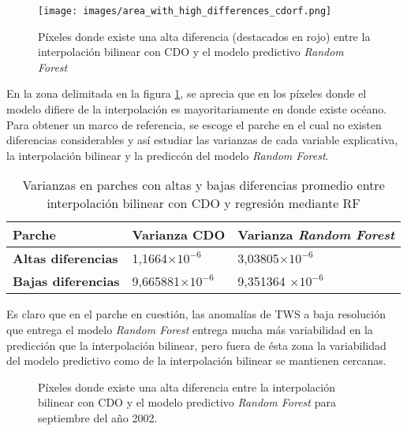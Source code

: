 \begin{figure}[H]
    \centering
          \texttt{[image: images/area\_with\_high\_differences\_cdorf.png]}
          \vskip -0.1in
    \caption[Área donde la interpolación bilinear y el modelo predictivo difieren considerablemente]{Píxeles donde existe una alta diferencia (destacados en rojo) entre la interpolación bilinear con CDO y el modelo predictivo \textit{Random Forest}}
    \label{high_diff}
\end{figure}
En la zona delimitada en la figura \ref{high_diff}, se aprecia que en los píxeles donde el modelo difiere de la interpolación es mayoritariamente en donde existe océano. Para obtener un marco de referencia, se escoge el parche en el cual no existen diferencias 
considerables y así estudiar las varianzas de cada variable explicativa, la interpolación bilinear y la prediccón del modelo  \textit{Random Forest}.

\begin{table}[H] 
    \caption[Varianzas en diferentes parches de CDO y RF]{Varianzas en parches con altas y bajas diferencias promedio entre interpolación bilinear con CDO y regresión mediante RF}
    \begin{tabularx}{0.9\textwidth}{CCC}
    \toprule
    \textbf{Parche}	& \textbf{Varianza CDO}	& \textbf{Varianza \textit{Random Forest}} \\
        \midrule
        \textbf{Altas diferencias}		& 1,1664$\times 10^{-6}$ &3,03805$\times 10^{-6}$  \\
        \textbf{Bajas diferencias}		 & 9,665881$\times 10^{-6}$ & 9,351364 $\times 10^{-6}$\\
        \bottomrule
    \end{tabularx}
\end{table}
\newpage

Es claro que en el parche en cuestión, las anomalías de TWS a baja resolución que entrega el modelo \textit{Random Forest} entrega mucha más variabilidad en la predicción que la interpolación bilinear, pero fuera de ésta zona
la variabilidad del modelo predictivo como de la interpolación bilinear se mantienen cercanas.

\begin{figure}[H]
    \centering
          \vskip -0.1in
    \caption[Área donde la interpolación bilinear y el modelo predictivo difieren en el periodo 09/2002]{Píxeles donde existe una alta diferencia entre la interpolación bilinear con CDO y el modelo predictivo \textit{Random Forest} para septiembre del año 2002.}
    \label{bilrf2002}
\end{figure}

